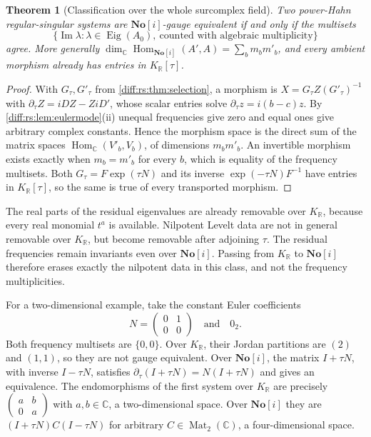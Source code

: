 \documentclass[11pt,letterpaper]{article}
\numberwithin{equation}{section}
\newtheorem{theorem}{Theorem}[section]
\theoremstyle{definition}
\theoremstyle{remark}
\newcommand{\SC}{\mathbf{No}[i]}
\newcommand{\R}{\mathbb R}
\newcommand{\C}{\mathbb C}
\newcommand{\der}{\partial}
\newcommand{\Imm}{\operatorname{Im}}
\newcommand{\Mat}{\operatorname{Mat}}
\newcommand{\Hom}{\operatorname{Hom}}
\newcommand{\derT}{\der_{\tau}}
\newcommand{\KR}{K_{\R}}
\newcommand{\Eig}{\operatorname{Eig}}
\begin{document}
\begin{theorem}[Classification over the whole surcomplex field]
\label{diff:rs:thm:SCclass}
Two power-Hahn regular-singular systems are $\SC$-gauge equivalent if and only
if the multisets
\[
 \{\Imm\lambda:\lambda\in\Eig(A_{0}),\ \text{counted with algebraic multiplicity}\}
\]
agree. More generally $\dim_{\C}\Hom_{\SC}(A',A)=\sum_{b}m_{b}m'_{b}$, and every
ambient morphism already has entries in $\KR[\tau]$.
\end{theorem}
\begin{proof}
With $G_{\tau},G'_{\tau}$ from \cref{diff:rs:thm:selection}, a morphism is
$X=G_{\tau}Z(G'_{\tau})^{-1}$ with $\derT Z=iDZ-ZiD'$, whose scalar entries solve
$\derT z=i(b-c)z$. By \cref{diff:rs:lem:eulermode}(ii) unequal frequencies give
zero and equal ones give arbitrary complex constants. Hence the
morphism space is the direct sum of the matrix spaces
$\Hom_{\C}(V'_b,V_b)$, of dimensions $m_bm'_b$.
An invertible morphism exists exactly when $m_b=m'_b$ for every $b$,
which is equality of the frequency multisets.
Both $G_{\tau}=F\exp(\tau N)$ and its inverse
$\exp(-\tau N)F^{-1}$ have entries in $\KR[\tau]$, so the same is
true of every transported morphism.
\end{proof}

\begin{remark}
\label{diff:rs:rem:twolevels}
The real parts of the residual eigenvalues are already removable over $\KR$,
because every real monomial $t^{a}$ is available. Nilpotent Levelt data are not
in general removable over $\KR$, but become removable after adjoining $\tau$.
The residual frequencies remain invariants even over $\SC$. Passing from $\KR$ to
$\SC$ therefore erases exactly the nilpotent data in this class, and not the
frequency multiplicities.
\end{remark}

For a two-dimensional example, take the constant Euler coefficients
\[
 N=\begin{pmatrix}0&1\\0&0\end{pmatrix}
 \quad\text{and}\quad 0_{2}.
\]
Both frequency multisets are $\{0,0\}$. Over $\KR$, their Jordan
partitions are $(2)$ and $(1,1)$, so they are not gauge equivalent.
Over $\SC$, the matrix $I+\tau N$, with inverse $I-\tau N$, satisfies
$\derT(I+\tau N)=N(I+\tau N)$ and gives an equivalence.
The endomorphisms of the first system over $\KR$ are precisely
$\left(\begin{smallmatrix}a&b\\0&a\end{smallmatrix}\right)$ with
$a,b\in\C$, a two-dimensional space. Over $\SC$ they are
$(I+\tau N)C(I-\tau N)$ for arbitrary $C\in\Mat_{2}(\C)$, a
four-dimensional space.
\end{document}
